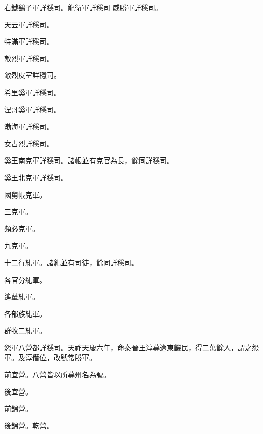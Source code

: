 \begin{pinyinscope}
 右鐵鷂子軍詳穩司。龍衛軍詳穩司
 威勝軍詳穩司。



 天云軍詳穩司。



 特滿軍詳穩司。



 敵烈軍詳穩司。



 敵烈皮室詳穩司。



 希里奚軍詳穩司。



 涅哥奚軍詳穩司。



 渤海軍詳穩司。



 女古烈詳穩司。



 奚王南克軍詳穩司。諸帳並有克官為長，餘同詳穩司。



 奚王北克軍詳穩司。



 國舅帳克軍。



 三克軍。



 頻必克軍。



 九克軍。



 十二行糺軍。諸糺並有司徒，餘同詳穩司。



 各官分糺軍。



 遙輦糺軍。



 各部族糺軍。



 群牧二糺軍。



 怨軍八營都詳穩司。天祚天慶六年，命秦晉王淳募遼東饑民，得二萬餘人，謂之怨軍。及淳僭位，改號常勝軍。



 前宜營。八營皆以所募州名為號。



 後宜營。



 前錦營。



 後錦營。乾營。




\end{pinyinscope}
